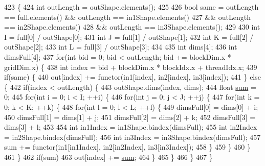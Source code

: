 \begin{DoxyCode}
423                                             \{
424   \textcolor{keywordtype}{int} outLength = outShape.elements();
425 
426   \textcolor{keywordtype}{bool} same = outLength == full.elements() && outLength == in1Shape.elements()
427               && outLength == in2Shape.elements()
428               && outLength == in3Shape.elements();
429 
430   \textcolor{keywordtype}{int} I = full[0] / outShape[0];
431   \textcolor{keywordtype}{int} J = full[1] / outShape[1];
432   \textcolor{keywordtype}{int} K = full[2] / outShape[2];
433   \textcolor{keywordtype}{int} L = full[3] / outShape[3];
434 
435   \textcolor{keywordtype}{int} dims[4];
436   \textcolor{keywordtype}{int} dimsFull[4];
437   \textcolor{keywordflow}{for}(\textcolor{keywordtype}{int} bid = 0; bid < outLength; bid += blockDim.x * gridDim.x) \{
438     \textcolor{keywordtype}{int} index = bid + blockDim.x * blockIdx.x + threadIdx.x;
439     \textcolor{keywordflow}{if}(same) \{
440       out[index] += functor(in1[index], in2[index], in3[index]);
441     \} \textcolor{keywordflow}{else} \{
442       \textcolor{keywordflow}{if}(index < outLength) \{
443         outShape.dims(index, dims);
444         \textcolor{keywordtype}{float} \hyperlink{namespacemarian_a460460a6de63beebc5d968b44d49d11b}{sum} = 0;
445         \textcolor{keywordflow}{for}(\textcolor{keywordtype}{int} i = 0; i < I; ++i) \{
446           \textcolor{keywordflow}{for}(\textcolor{keywordtype}{int} j = 0; j < J; ++j) \{
447             \textcolor{keywordflow}{for}(\textcolor{keywordtype}{int} k = 0; k < K; ++k) \{
448               \textcolor{keywordflow}{for}(\textcolor{keywordtype}{int} l = 0; l < L; ++l) \{
449                 dimsFull[0] = dims[0] + i;
450                 dimsFull[1] = dims[1] + j;
451                 dimsFull[2] = dims[2] + k;
452                 dimsFull[3] = dims[3] + l;
453 
454                 \textcolor{keywordtype}{int} in1Index = in1Shape.bindex(dimsFull);
455                 \textcolor{keywordtype}{int} in2Index = in2Shape.bindex(dimsFull);
456                 \textcolor{keywordtype}{int} in3Index = in3Shape.bindex(dimsFull);
457                 sum += functor(in1[in1Index], in2[in2Index], in3[in3Index]);
458               \}
459             \}
460           \}
461         \}
462         \textcolor{keywordflow}{if}(sum)
463           out[index] += \hyperlink{namespacemarian_a460460a6de63beebc5d968b44d49d11b}{sum};
464       \}
465     \}
466   \}
467 \}
\end{DoxyCode}


